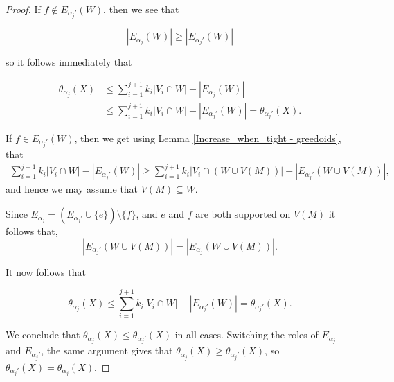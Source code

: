 \documentclass[10pt,a4paper]{amsart}
\begin{document}
\begin{proof}
 If $f \notin E_{\alpha_j'}(W)$, then we see that

 \[|E_{\alpha_j}(W)| \geq |E_{\alpha_j'}(W)|\]

so it follows immediately that 

\begin{align*}
    \theta_{\alpha_j}(X) &\leq  \sum_{i=1}^{j+1} k_i |V_i \cap W| - |E_{\alpha_{j}}(W)| \\
    &\leq \sum_{i=1}^{j+1} k_i |V_i \cap W| - |E_{\alpha_{j}'}(W)| = \theta_{\alpha_j'}(X).
\end{align*}
 
 If $f \in E_{\alpha_j'}(W)$, then we get using Lemma \ref{Increase_when_tight - greedoids}, that
\begin{align*}
\sum_{i=1}^{j+1} k_i |V_i\cap W| - |E_{\alpha_j'}(W)|  \geq \sum_{i=1}^{j+1} k_i |V_i\cap (W\cup V(M))| - |E_{\alpha_{j}'}(W \cup V(M))|,
\end{align*}
and hence we may assume that $V(M) \subseteq W$.

Since $E_{\alpha_{j}} = \left (E_{\alpha_{j}'} \cup \{e\}\right) \setminus \{f\}$, and $e$ and $f$ are both supported on $V(M)$ it follows that,
$$|E_{\alpha_{j}'}(W\cup V(M))|=|E_{\alpha_{j}}(W\cup V(M))|.$$

It now follows that

$$\theta_{\alpha_j}(X) \leq  \sum_{i=1}^{j+1} k_i |V_i \cap W| - |E_{\alpha_{j}'}(W)| = \theta_{\alpha_j'}(X).$$


We conclude that $\theta_{\alpha_j}(X)\leq \theta_{\alpha_j'}(X)$ in all cases. Switching the roles of $E_{\alpha_j}$ and $E_{\alpha_j'}$, the same argument gives that $\theta_{\alpha_j}(X) \geq \theta_{\alpha_j'}(X)$, so $\theta_{\alpha_j'}(X) = \theta_{\alpha_j}(X)$. 
\end{proof}
\end{document}
